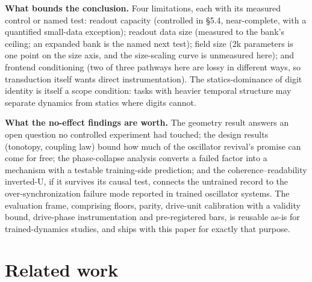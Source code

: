 \documentclass[10pt]{article}
\makeatletter
\newcommand{\tmlr@floatbarrier}{\par\vspace{\z@}%
  \ifx\@deferlist\@empty\else\clearpage\fi}
\let\tmlr@section\section
\renewcommand{\section}{\tmlr@floatbarrier\tmlr@section}
\makeatother
\begin{document}
\textbf{What bounds the conclusion.} Four limitations, each with its
measured control or named test: readout capacity (controlled in §5.4,
near-complete, with a quantified small-data exception); readout data
size (measured to the bank's ceiling; an expanded bank is the named next
test); field size (2k parameters is one point on the size axis, and the
size-scaling curve is unmeasured here); and frontend conditioning (two
of three pathways here are lossy in different ways, so transduction
itself wants direct instrumentation). The statics-dominance of digit
identity is itself a scope condition: tasks with heavier temporal
structure may separate dynamics from statics where digits cannot.

\textbf{What the no-effect findings are worth.} The geometry result
answers an open question no controlled experiment had touched; the
design results (tonotopy, coupling law) bound how much of the oscillator
revival's promise can come for free; the phase-collapse analysis
converts a failed factor into a mechanism with a testable training-side
prediction; and the coherence--readability inverted-U, if it survives
its causal test, connects the untrained record to the
over-synchronization failure mode reported in trained oscillator
systems. The evaluation frame, comprising floors, parity, drive-unit
calibration with a validity bound, drive-phase instrumentation and
pre-registered bars, is reusable as-is for trained-dynamics studies, and
ships with this paper for exactly that purpose.

\section{Related work}\label{related-work}
\end{document}
